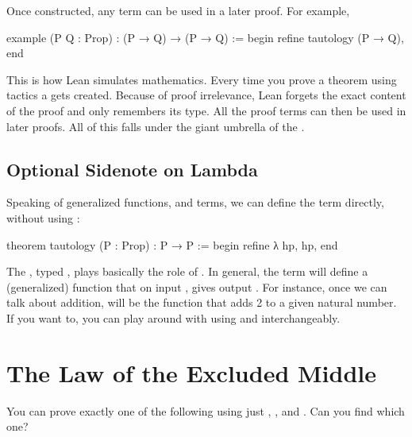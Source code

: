 \documentclass[letterpaper,10pt,english]{sphinxmanual}
\begin{document}
\sphinxAtStartPar
Once constructed, any term can be used in a later proof. For example,

\begin{sphinxVerbatim}[commandchars=\\\{\}]
example (P Q : Prop) : (P → Q) → (P → Q) :=
begin
  refine tautology (P → Q),
end
\end{sphinxVerbatim}

\sphinxAtStartPar
This is how Lean simulates mathematics.
Every time you prove a theorem using tactics a  gets created.
Because of proof irrelevance, Lean forgets the exact content of the proof and
only remembers its type.
All the proof terms can then be used in later proofs.
All of this falls under the giant umbrella of the .


\subsection{Optional Sidenote on Lambda}
\label{\detokenize{day2:optional-sidenote-on-lambda}}
\sphinxAtStartPar
Speaking of generalized functions, and terms, we can define the term  directly, without using :

\begin{sphinxVerbatim}[commandchars=\\\{\}]
theorem tautology (P : Prop) : P → P :=
begin
  refine λ hp, hp,
end
\end{sphinxVerbatim}

\sphinxAtStartPar
The , typed , plays basically the role of .
In general, the term  will define a (generalized) function that on input , gives output .
For instance, once we can talk about addition,  will be the function that adds 2 to a given natural number.
If you want to, you can play around with using  and  interchangeably.


\section{The Law of the Excluded Middle}
\label{\detokenize{day2:the-law-of-the-excluded-middle}}
\sphinxAtStartPar
You can prove exactly one of the following using just , , and .
Can you find which one?
\end{document}
